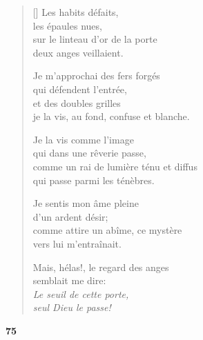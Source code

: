 \documentclass[a4paper,12pt]{book}
\begin{document}
\begin{verse}[\versewidth]
  Les habits défaits, \\
  les épaules nues, \\
  sur le linteau d'or de la porte \\
  deux anges veillaient.

  Je m'approchai des fers forgés \\
  qui défendent l'entrée, \\
  et des doubles grilles \\
  je la vis, au fond, confuse et blanche.

  Je la vis comme l'image \\
  qui dans une rêverie passe, \\
  comme un rai de lumière ténu et diffus \\
  qui passe parmi les ténèbres.

  Je sentis mon âme pleine \\
  d'un ardent désir; \\
  comme attire un abîme, ce mystère \\
  vers lui m'entraînait.

  Mais, hélas!, le regard des anges \\
  semblait me dire: \\
  \emph{Le seuil de cette porte, \\
  seul Dieu le passe!}
\end{verse}

\bigskip

\begin{center}
  \textbf{75}
\end{center}

\settowidth{\versewidth}{ce que je sais, c'est que je connais maintes gens}
\end{document}
